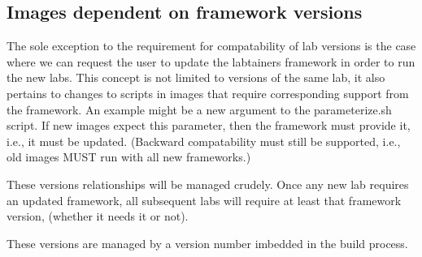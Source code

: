 \subsection{Images dependent on framework versions}
The sole exception to the requirement for compatability of lab versions is the
case where we can request the user to update the labtainers framework in order
to run the new labs.  This concept is not limited to versions of the same lab,
it also pertains to changes to scripts in images that require corresponding
support from the framework.  An example might be a new argument to the
parameterize.sh script.  If new images expect this parameter, then the framework
must provide it, i.e., it must be updated.  (Backward compatability must still be
supported, i.e., old images MUST run with all new frameworks.)

These versions relationships will be managed crudely.  Once any new lab requires an
updated framework, all subsequent labs will require at least that framework version,
(whether it needs it or not).

These versions are managed by a version number imbedded in the build process.
